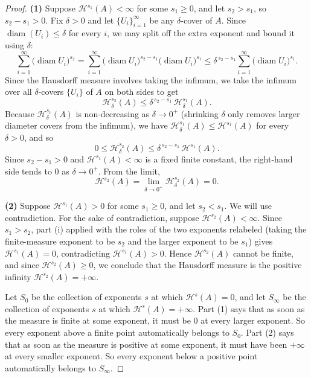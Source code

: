 \documentclass{article}
\begin{document}
\begin{proof}
\textbf{(1)} Suppose $\mathcal{H}^{s_1}(A) < \infty$ for some $s_1 \ge 0$, and let $s_2 > s_1$, so $s_2 - s_1 > 0$. Fix $\delta > 0$ and let $\{U_i\}_{i=1}^{\infty}$ be any $\delta$-cover of $A$. Since $\operatorname{diam}(U_i) \le \delta$ for every $i$, we may split off the extra exponent and bound it using $\delta$:
\[
\sum_{i=1}^{\infty} \big(\operatorname{diam} U_i\big)^{s_2}
= \sum_{i=1}^{\infty} \big(\operatorname{diam} U_i\big)^{s_2-s_1}\big(\operatorname{diam} U_i\big)^{s_1}
\le \delta^{\,s_2-s_1} \sum_{i=1}^{\infty} \big(\operatorname{diam} U_i\big)^{s_1}.
\]
Since the Hausdorff measure involves taking the infimum, we take the infimum over all $\delta$-covers $\{U_i\}$ of $A$ on both sides to get
\[
\mathcal{H}_\delta^{s_2}(A) \le \delta^{\,s_2-s_1}\, \mathcal{H}_\delta^{s_1}(A).
\]
Because $\mathcal{H}_\delta^{s_1}(A)$ is non-decreasing as $\delta \to 0^+$ (shrinking $\delta$ only removes larger diameter covers from the infimum), we have $\mathcal{H}_\delta^{s_1}(A) \le \mathcal{H}^{s_1}(A)$ for every $\delta > 0$, and so
\[
0 \le \mathcal{H}_\delta^{s_2}(A) \le \delta^{\,s_2-s_1}\,\mathcal{H}^{s_1}(A).
\]
Since $s_2 - s_1 > 0$ and $\mathcal{H}^{s_1}(A) < \infty$ is a fixed finite constant, the right-hand side tends to $0$ as $\delta \to 0^+$. From the limit,
\[
\mathcal{H}^{s_2}(A) = \lim_{\delta \to 0^+} \mathcal{H}_\delta^{s_2}(A) = 0.
\]

\vspace{0.5em}

\textbf{(2)} Suppose $\mathcal{H}^{s_1}(A) > 0$ for some $s_1 \ge 0$, and let $s_2 < s_1$. We will use contradiction. For the sake of contradiction, suppose $\mathcal{H}^{s_2}(A) < \infty$. Since $s_1 > s_2$, part (i) applied with the roles of the two exponents relabeled (taking the finite-measure exponent to be $s_2$ and the larger exponent to be $s_1$) gives $\mathcal{H}^{s_1}(A) = 0$, contradicting $\mathcal{H}^{s_1}(A) > 0$. Hence $\mathcal{H}^{s_2}(A)$ cannot be finite, and since $\mathcal{H}^{s_2}(A) \geq 0$, we conclude that the Hausdorff measure is the positive infinity $\mathcal{H}^{s_2}(A) = +\infty$.

\vspace{0.5em}

Let $S_0$ be the collection of exponents $s$ at which $\mathcal{H}^s(A) = 0$, and let $S_\infty$ be the collection of exponents $s$ at which $\mathcal{H}^s(A) = +\infty$. Part (1) says that as soon as the measure is finite at some exponent, it must be $0$ at every larger exponent. So every exponent above a finite point automatically belongs to $S_0$. Part (2) says that as soon as the measure is positive at some exponent, it must have been $+\infty$ at every smaller exponent. So every exponent below a positive point automatically belongs to $S_\infty$.
 

\end{proof}
\end{document}
